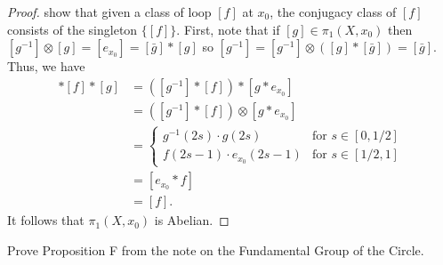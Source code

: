 \begin{proof}
show that given a class of loop $[f]$ at $x_0$, the conjugacy class of
$[f]$ consists of the singleton $\{[f]\}$. First, note that if
$[g]\in\pi_1(X,x_0)$ then $[g^{-1}]\otimes [g]=[e_{x_0}]=[\bar g]*[g]$ so
$[g^{-1}]=[g^{-1}]\otimes ([g]*[\bar g])=[\bar g]$. Thus, we have
\begin{align*}
[\bar g]*[f]*[g]
&=\left([g^{-1}]*[f]\right)*[g*e_{x_0}]\\
&=\left([g^{-1}]*[f]\right)\otimes [g*e_{x_0}]\\
&=\begin{cases}
g^{-1}(2s)\cdot g(2s)&\text{for $s\in[0,1/2]$}\\
f(2s-1)\cdot e_{x_0}(2s-1)&\text{for $s\in[1/2,1]$}
\end{cases}\\
&=[e_{x_0}*f]\\
&=[f].
\end{align*}
It follows that $\pi_1(X,x_0)$ is Abelian.
\end{proof}
\newpage
\begin{problem}[(A)]
Prove Proposition F from the note on the Fundamental Group of the
Circle.
\end{problem}
